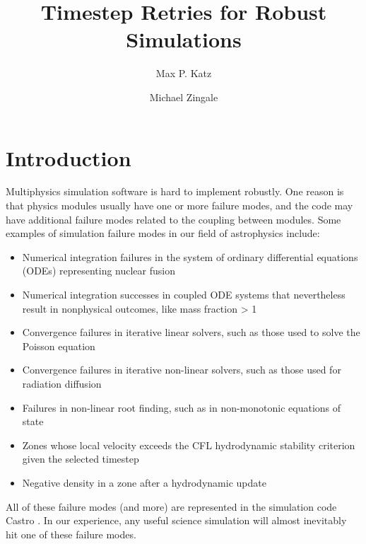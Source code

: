 \documentclass[times,modern]{elsarticle}
\begin{document}
\title{Timestep Retries for Robust Simulations}

\author{Max P. Katz}
\author{Michael Zingale}

\maketitle

\begin{abstract}
\end{abstract}

\section{Introduction}\label{Sec:Introduction}

Multiphysics simulation software is hard to implement robustly. One reason is that
physics modules usually have one or more failure modes, and the code may have
additional failure modes related to the coupling between modules. Some examples of
simulation failure modes in our field of astrophysics include:
\begin{itemize}
  \item Numerical integration failures in the system of ordinary differential equations (ODEs) representing nuclear fusion
  \item Numerical integration successes in coupled ODE systems that nevertheless result in nonphysical outcomes, like mass fraction > 1
  \item Convergence failures in iterative linear solvers, such as those used to solve the Poisson equation
  \item Convergence failures in iterative non-linear solvers, such as those used for radiation diffusion
  \item Failures in non-linear root finding, such as in non-monotonic equations of state
  \item Zones whose local velocity exceeds the CFL hydrodynamic stability criterion given the selected timestep
  \item Negative density in a zone after a hydrodynamic update
\end{itemize}
All of these failure modes (and more) are represented in the simulation code Castro \citep{castro_joss}.
In our experience, any useful science simulation will almost inevitably hit one of these failure modes.
\end{document}
